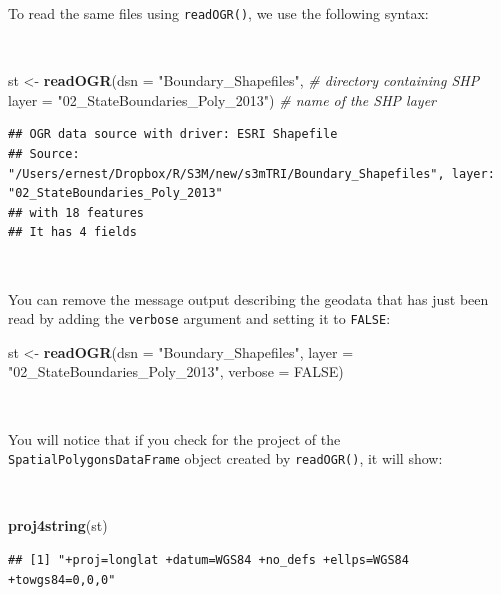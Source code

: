 \documentclass[11pt,a4paper]{article}
\newenvironment{Shaded}{}{}
\newcommand{\KeywordTok}[1]{\textcolor[rgb]{0.00,0.44,0.13}{\textbf{#1}}}
\newcommand{\DataTypeTok}[1]{\textcolor[rgb]{0.56,0.13,0.00}{#1}}
\newcommand{\StringTok}[1]{\textcolor[rgb]{0.25,0.44,0.63}{#1}}
\newcommand{\CommentTok}[1]{\textcolor[rgb]{0.38,0.63,0.69}{\textit{#1}}}
\newcommand{\OtherTok}[1]{\textcolor[rgb]{0.00,0.44,0.13}{#1}}
\newcommand{\NormalTok}[1]{#1}
\begin{document}
To read the same files using \texttt{readOGR()}, we use the following
syntax:

~

\begin{Shaded}
\begin{Highlighting}[]
\NormalTok{st <-}\StringTok{ }\KeywordTok{readOGR}\NormalTok{(}\DataTypeTok{dsn =} \StringTok{"Boundary_Shapefiles"}\NormalTok{,            }\CommentTok{# directory containing SHP}
              \DataTypeTok{layer =} \StringTok{"02_StateBoundaries_Poly_2013"}\NormalTok{) }\CommentTok{# name of the SHP layer}
\end{Highlighting}
\end{Shaded}

\begin{verbatim}
## OGR data source with driver: ESRI Shapefile 
## Source: "/Users/ernest/Dropbox/R/S3M/new/s3mTRI/Boundary_Shapefiles", layer: "02_StateBoundaries_Poly_2013"
## with 18 features
## It has 4 fields
\end{verbatim}

~

You can remove the message output describing the geodata that has just
been read by adding the \texttt{verbose} argument and setting it to
\texttt{FALSE}:

\begin{Shaded}
\begin{Highlighting}[]
\NormalTok{st <-}\StringTok{ }\KeywordTok{readOGR}\NormalTok{(}\DataTypeTok{dsn =} \StringTok{"Boundary_Shapefiles"}\NormalTok{,}
              \DataTypeTok{layer =} \StringTok{"02_StateBoundaries_Poly_2013"}\NormalTok{,}
              \DataTypeTok{verbose =} \OtherTok{FALSE}\NormalTok{)}
\end{Highlighting}
\end{Shaded}

~

You will notice that if you check for the project of the
\texttt{SpatialPolygonsDataFrame} object created by \texttt{readOGR()},
it will show:

~

\begin{Shaded}
\begin{Highlighting}[]
\KeywordTok{proj4string}\NormalTok{(st)}
\end{Highlighting}
\end{Shaded}

\begin{verbatim}
## [1] "+proj=longlat +datum=WGS84 +no_defs +ellps=WGS84 +towgs84=0,0,0"
\end{verbatim}
\end{document}
